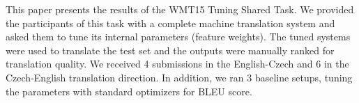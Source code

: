 This paper presents the results of the WMT15 Tuning Shared Task. We provided the participants of this task with a complete machine translation system and asked them to tune its internal parameters (feature weights). The tuned systems were used to translate the test set and the outputs were manually ranked for translation quality. We received 4 submissions in the English-Czech and 6 in the Czech-English translation direction. In addition, we ran 3 baseline setups, tuning the parameters with standard optimizers for BLEU score.

